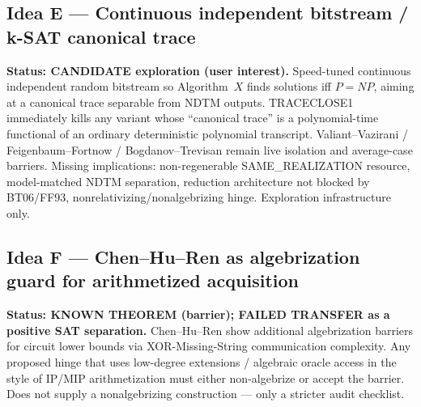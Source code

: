 \documentclass[11pt]{article}
\begin{document}
\subsection*{Idea E --- Continuous independent bitstream / k-SAT canonical trace}
\textbf{Status: CANDIDATE exploration (user interest).}
Speed-tuned continuous independent random bitstream so Algorithm~$X$ finds solutions iff
$P=NP$, aiming at a canonical trace separable from NDTM outputs. TRACECLOSE1 immediately
kills any variant whose ``canonical trace'' is a polynomial-time functional of an ordinary
deterministic polynomial transcript. Valiant--Vazirani / Feigenbaum--Fortnow /
Bogdanov--Trevisan remain live isolation and average-case barriers. Missing implications:
non-regenerable SAME\_REALIZATION resource, model-matched NDTM separation, reduction
architecture not blocked by BT06/FF93, nonrelativizing/nonalgebrizing hinge. Exploration
infrastructure only.

\subsection*{Idea F --- Chen--Hu--Ren as algebrization guard for arithmetized acquisition}
\textbf{Status: KNOWN THEOREM (barrier); FAILED TRANSFER as a positive SAT separation.}
Chen--Hu--Ren show additional algebrization barriers for circuit lower bounds via
XOR-Missing-String communication complexity. Any proposed hinge that uses low-degree
extensions / algebraic oracle access in the style of IP/MIP arithmetization must either
non-algebrize or accept the barrier. Does not supply a nonalgebrizing construction --- only
a stricter audit checklist.
\end{document}
